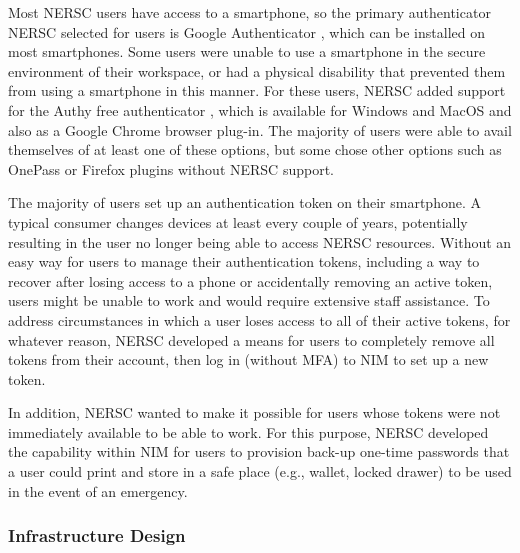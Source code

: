 \documentclass[sigconf,review]{acmart}
\begin{document}
Most NERSC users have access to a smartphone, so the primary authenticator NERSC
selected for users is Google Authenticator \cite{gauth}, which can be installed
on most smartphones. Some users were unable to use a smartphone in the secure
environment of their workspace, or had a physical disability that prevented them
from using a smartphone in this manner. For these users, NERSC added support for
the Authy free authenticator \cite{authy}, which is available for Windows and
MacOS and also as a Google Chrome browser plug-in. The majority of users were
able to avail themselves of at least one of these options, but some chose other
options such as OnePass or Firefox plugins without NERSC support.

The majority of users set up an authentication token on their smartphone. A
typical consumer changes devices at least every couple of years, potentially
resulting in the user no longer being able to access NERSC resources. Without an
easy way for users to manage their authentication tokens, including a way to
recover after losing access to a phone or accidentally removing an active token,
users might be unable to work and would require extensive staff assistance. To
address circumstances in which a user loses access to all of their active
tokens, for whatever reason, NERSC developed a means for users to completely
remove all tokens from their account, then log in (without MFA) to NIM to set up
a new token.

In addition, NERSC wanted to make it possible for users whose tokens were not
immediately available to be able to work. For this purpose,
NERSC developed the capability within NIM for users to provision back-up
one-time passwords that a user could print and store in a safe place (e.g.,
wallet, locked drawer) to be used in the event of an emergency.

\subsubsection{Infrastructure Design}
\label{infra}
\end{document}

